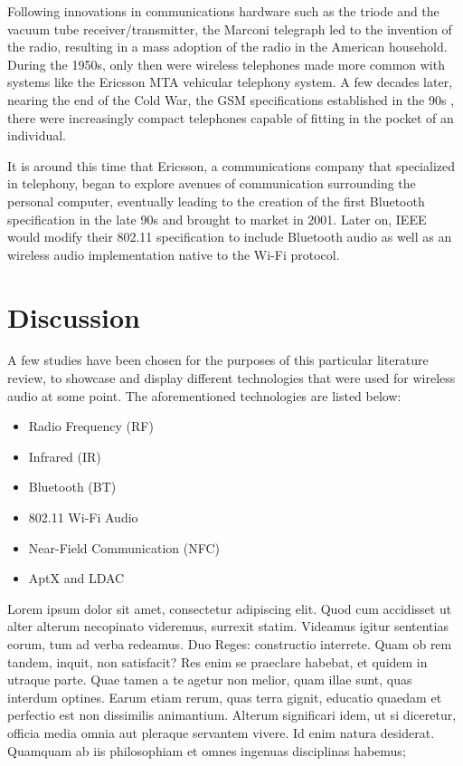 \documentclass[conference]{IEEEtran}
\begin{document}
Following innovations in communications hardware such as the triode and the vacuum tube
receiver/transmitter\cite{white_pre-war_2003}, the Marconi telegraph led to the invention of
the radio, resulting in a mass adoption of the radio in the American household.\cite
{noauthor_ericsson_2001} During the 1950s, only then were wireless telephones made more
common with systems like the Ericsson MTA vehicular telephony system. A few decades later,
nearing the end of the Cold War, the GSM specifications established in the 90s
\cite{suresh_introduction_2023}, there were increasingly compact telephones capable of
fitting in the pocket of an individual.\cite{noauthor_ericsson_2001}

It is around this time that Ericsson, a communications company that specialized in telephony,
began to explore avenues of communication surrounding the personal computer, eventually
leading to the creation of the first Bluetooth specification in the late 90s and brought to
market in 2001.\cite{irekvist_bluetooth_2022} Later on, IEEE would modify their 802.11
specification to include Bluetooth audio as well as an wireless audio implementation native
to the Wi-Fi protocol.\cite{noauthor_bluetooth_nodate}

\section*{Discussion}

A few studies have been chosen for the purposes of this particular literature review, to
showcase and display different technologies that were used for wireless audio at some point.
The aforementioned technologies are listed below:

\begin{itemize}
    \item Radio Frequency (RF)
    \item Infrared (IR)
    \item Bluetooth (BT)
    \item 802.11 Wi-Fi Audio
    \item Near-Field Communication (NFC)
    \item AptX and LDAC
\end{itemize}

Lorem ipsum dolor sit amet, consectetur adipiscing elit. Quod cum accidisset ut alter alterum
necopinato videremus, surrexit statim. Videamus igitur sententias eorum, tum ad verba
redeamus. Duo Reges: constructio interrete. Quam ob rem tandem, inquit, non satisfacit? Res
enim se praeclare habebat, et quidem in utraque parte. Quae tamen a te agetur non melior,
quam illae sunt, quas interdum optines. Earum etiam rerum, quas terra gignit, educatio
quaedam et perfectio est non dissimilis animantium. Alterum significari idem, ut si
diceretur, officia media omnia aut pleraque servantem vivere. Id enim natura desiderat.
Quamquam ab iis philosophiam et omnes ingenuas disciplinas habemus;
\end{document}
